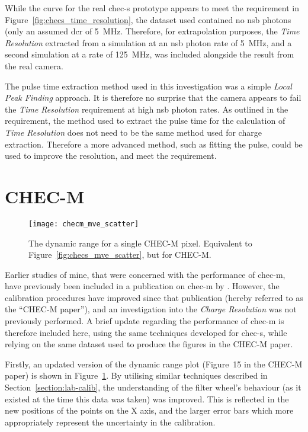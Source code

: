 While the curve for the real \gls{chec-s} prototype appears to meet the requirement in Figure~\ref{fig:checs_time_resolution}, the dataset used contained no \gls{nsb} photons (only an assumed \gls{dcr} of \SI{5}{MHz}. Therefore, for extrapolation purposes, the \textit{Time Resolution} extracted from a simulation at an \gls{nsb} photon rate of \SI{5}{MHz}, and a second simulation at a rate of \SI{125}{MHz}, was included alongside the result from the real camera.

The pulse time extraction method used in this investigation was a simple \textit{Local Peak Finding} approach. It is therefore no surprise that the camera appears to fail the \textit{Time Resolution} requirement at high \gls{nsb} photon rates. As outlined in the requirement, the method used to extract the pulse time for the calculation of \textit{Time Resolution} does not need to be the same method used for charge extraction. Therefore a more advanced method, such as fitting the pulse, could be used to improve the resolution, and meet the requirement.

\section{CHEC-M}

\begin{figure}
	\centering
    \texttt{[image: checm\_mve\_scatter]} 
	\caption[CHEC-M average measured charge versus average expected charge.]{The dynamic range for a single CHEC-M pixel. Equivalent to Figure~\ref{fig:checs_mve_scatter}, but for CHEC-M.}
	\label{fig:checm_mve_scatter}
\end{figure}

Earlier studies of mine, that were concerned with the performance of \gls{chec-m}, have previously been included in a publication on \gls{chec-m} by \textcite{Zorn2017}. However, the calibration procedures have improved since that publication (hereby referred to as the ``CHEC-M paper''), and an investigation into the \textit{Charge Resolution} was not previously performed. A brief update regarding the performance of \gls{chec-m} is therefore included here, using the same techniques developed for \gls{chec-s}, while relying on the same dataset used to produce the figures in the CHEC-M paper.

Firstly, an updated version of the dynamic range plot (Figure~15 in the \mbox{CHEC-M} paper) is shown in Figure~\ref{fig:checm_mve_scatter}. By utilising similar techniques described in Section~\ref{section:lab-calib}, the understanding of the filter wheel's behaviour (as it existed at the time this data was taken) was improved. This is reflected in the new positions of the points on the X axis, and the larger error bars which more appropriately represent the uncertainty in the calibration.

